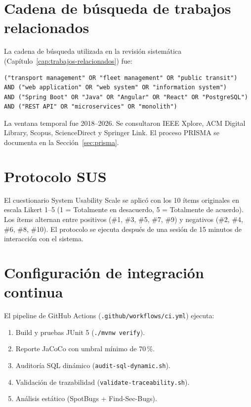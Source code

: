 \chapter{Cadena de búsqueda de trabajos relacionados}
\label{app:cadena-busqueda}

La cadena de búsqueda utilizada en la revisión sistemática (Capítulo~\ref{cap:trabajos-relacionados}) fue:

\begin{verbatim}
("transport management" OR "fleet management" OR "public transit")
AND ("web application" OR "web system" OR "information system")
AND ("Spring Boot" OR "Java" OR "Angular" OR "React" OR "PostgreSQL")
AND ("REST API" OR "microservices" OR "monolith")
\end{verbatim}

La ventana temporal fue 2018--2026. Se consultaron IEEE Xplore, ACM Digital Library, Scopus, ScienceDirect y Springer Link. El proceso PRISMA se documenta en la Sección~\ref{sec:prisma}.

\chapter{Protocolo SUS}
\label{app:sus}

El cuestionario System Usability Scale \cite{brooke1996} se aplicó con los 10 ítems originales en escala Likert 1--5 (1 = Totalmente en desacuerdo, 5 = Totalmente de acuerdo). Los ítems alternan entre positivos (\#1, \#3, \#5, \#7, \#9) y negativos (\#2, \#4, \#6, \#8, \#10). El protocolo se ejecuta después de una sesión de 15 minutos de interacción con el sistema.

\chapter{Configuración de integración continua}
\label{app:ci}

El pipeline de GitHub Actions (\texttt{.github/workflows/ci.yml}) ejecuta:
\begin{enumerate}
  \item Build y pruebas JUnit 5 (\texttt{./mvnw verify}).
  \item Reporte JaCoCo con umbral mínimo de 70\,\%.
  \item Auditoría SQL dinámico (\texttt{audit-sql-dynamic.sh}).
  \item Validación de trazabilidad (\texttt{validate-traceability.sh}).
  \item Análisis estático (SpotBugs + Find-Sec-Bugs).
\end{enumerate}

